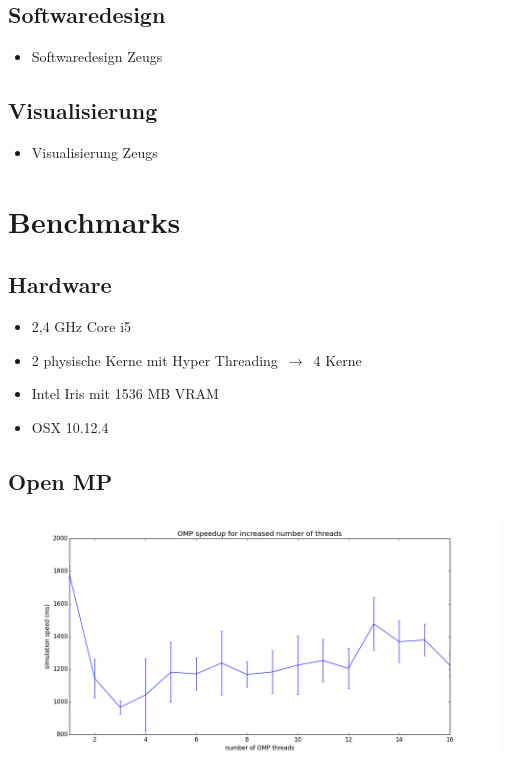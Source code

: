 \documentclass{beamer}
\begin{document}
\subsection{Softwaredesign}
\begin{frame}
\begin{itemize}
  \item Softwaredesign Zeugs
\end{itemize}
\end{frame}

\subsection{Visualisierung}
\begin{frame}
\begin{itemize}
  \item Visualisierung Zeugs
\end{itemize}
\end{frame}

\section{Benchmarks}
\subsection{Hardware}
\begin{frame}
\begin{itemize}
  \item 2,4 GHz Core i5
  \item 2 physische Kerne mit Hyper Threading $\,\to\,$ 4 Kerne
  \item Intel Iris mit 1536 MB VRAM
  \item OSX 10.12.4
\end{itemize}
\end{frame}

\subsection{Open MP}
\begin{frame}
\includegraphics[width=13cm]{img/omp.png}
\end{frame}
\end{document}
